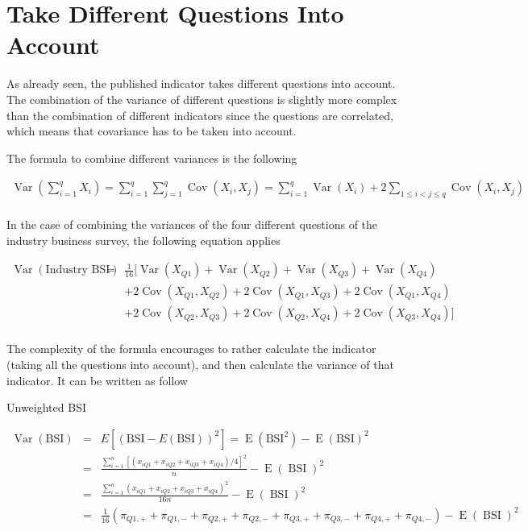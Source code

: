 \documentclass[12pt,a4paper,oneside]{book}
\DeclareMathOperator{\Var}{Var}
\DeclareMathOperator{\Cov}{Cov}
\DeclareMathOperator{\E}{E}
\DeclareMathOperator{\BSI}{BSI}
\begin{document}
\section{Take Different Questions Into Account}

As already seen, the published indicator takes different questions into account. 
The combination of the variance of different questions is slightly more complex than the combination of different indicators since the questions are correlated, which means that covariance has to be taken into account.

The formula to combine different variances is the following

\begin{eqnarray}
\Var \left(\sum_{i=1}^{q} X_{i}\right) = \sum_{i=1}^{q} \sum_{j=1}^{q} \Cov\left(X_{i}, X_{j}\right)
= \sum_{i=1}^{q} \Var\left(X_{i}\right)+2 \sum_{1 \leq i<j \leq q} \Cov\left(X_{i}, X_{j}\right) \\ \nonumber
\end{eqnarray} 

In the case of combining the variances of the four different questions of the industry business survey, the following equation applies

\begin{eqnarray}
    \Var \left( \text{Industry BSI} \right) 
    &=& \frac{1}{16} \Big[ \Var(X_{Q1}) + \Var(X_{Q2}) + \Var(X_{Q3}) + \Var(X_{Q4}) \nonumber \\
    && + 2 \Cov (X_{Q1},X_{Q2}) + 2 \Cov (X_{Q1},X_{Q3}) + 2 \Cov (X_{Q1},X_{Q4}) \nonumber \\
    &&  + 2 \Cov (X_{Q2},X_{Q3}) + 2 \Cov (X_{Q2},X_{Q4}) + 2 \Cov (X_{Q3},X_{Q4}) \Big] \nonumber \\
\end{eqnarray}

The complexity of the formula encourages to rather calculate the indicator (taking all the questions into account), and then calculate the variance of that indicator. It can be written as follow

Unweighted BSI

\begin{eqnarray}
         \Var(\text{BSI}) &=& E \left[ \left(\text{BSI}-E(\text{BSI}) \right)^2 \right] =  \E \left( \text{BSI}^2\right) - \E \left( \text{BSI}\right)^2 \\ 
         &=&  \frac{\sum^n_{i=1}[(x_{iQ1} + x_{iQ2} + x_{iQ3} + x_{iQ4})/4]^2}{n} - \E (\BSI)^2 \\
        &=&  \frac{\sum^n_{i=1}(x_{iQ1} + x_{iQ2} + x_{iQ3} + x_{iQ4})^2}{16n} - \E (\BSI)^2 \\
        &=& \frac{1}{16} \left( \pi_{Q1,+} + \pi_{Q1,-} + \pi_{Q2,+} + \pi_{Q2,-} + \pi_{Q3,+} + \pi_{Q3,-} + \pi_{Q4,+} + \pi_{Q4,-} \right) - \E (\BSI)^2 \nonumber \\ 
\end{eqnarray}
\end{document}
